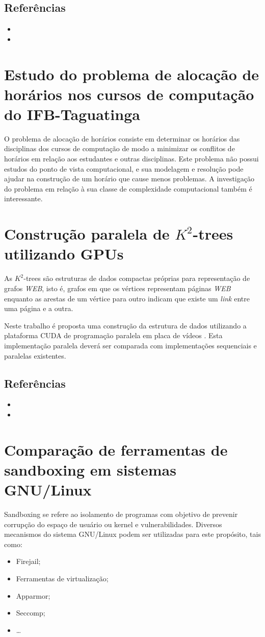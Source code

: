 \documentclass{article}
\newcommand*{\nsection}[1]{
    \section{#1}
}
\begin{document}
\subsection{Referências}

\begin{itemize}
	\item {}
	\item {}
\end{itemize}

\nsection{Estudo do problema de alocação de horários nos cursos de computação do IFB-Taguatinga}

O problema de alocação de horários consiste em determinar os horários das disciplinas dos cursos de computação de modo a minimizar os conflitos de horários em relação aos estudantes e outras disciplinas. Este problema não possui estudos do ponto de vista computacional, e sua modelagem e resolução pode ajudar na construção de um horário que cause menos problemas. A investigação do problema em relação à sua classe de complexidade computacional também é interessante. 


\nsection{Construção paralela de $K^2$-trees utilizando GPUs}

As $K^2$-trees são estruturas de dados compactas próprias para representação de grafos \textit{WEB}, isto é, grafos em que os vértices representam páginas \textit{WEB} enquanto as arestas de um vértice para outro indicam que existe um \textit{link} entre uma página e a outra.

Neste trabalho é proposta uma construção da estrutura de dados utilizando a plataforma CUDA de programação paralela em placa de vídeos . Esta implementação paralela deverá ser comparada com implementações sequenciais e paralelas existentes.

\subsection{Referências}

\begin{itemize}
	\item {}
	\item {}
\end{itemize}

\nsection{Comparação de ferramentas de sandboxing em sistemas GNU/Linux}

Sandboxing se refere ao isolamento de programas com objetivo de prevenir corrupção do espaço de usuário ou kernel e vulnerabilidades. Diversos mecanismos do sistema GNU/Linux podem ser utilizadas para este propósito, tais como: 
\begin{itemize}
	\item Firejail;
	\item Ferramentas de virtualização;
	\item Apparmor;
	\item Seccomp;
	\item \ldots
\end{itemize}
\end{document}
